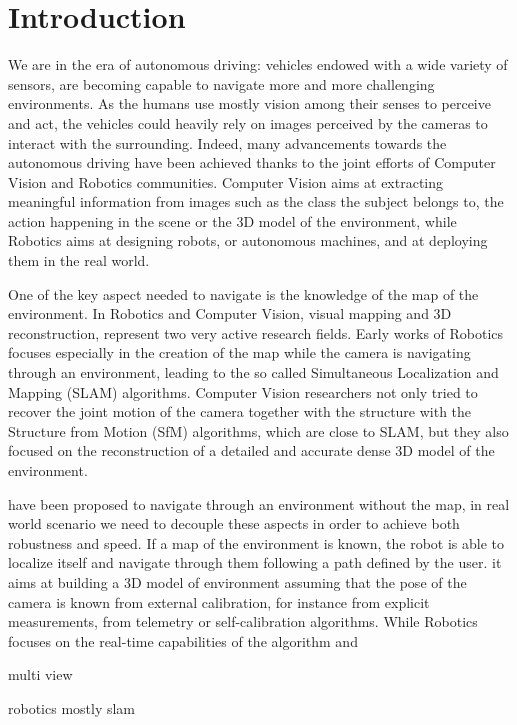 
\chapter{Introduction}
\label{sec:intro}
We are in the era of autonomous driving: vehicles endowed with a wide variety of sensors, are becoming  capable to navigate more and more challenging environments.
As the humans use mostly vision among their senses to perceive and act, the vehicles could heavily rely on images perceived by the cameras to interact with the surrounding.
Indeed, many advancements towards the autonomous driving have been achieved thanks to the joint efforts of Computer Vision and Robotics communities.
Computer Vision aims at extracting meaningful information from images such as the class the subject belongs to, the action happening in the scene or the 3D model of the environment, while Robotics aims at designing robots, or autonomous machines, and at deploying them in the real world.

One of the key aspect needed to navigate is the knowledge of the map of the environment. 
In Robotics and Computer Vision, visual mapping and 3D reconstruction, represent two very active research fields.
Early works of Robotics focuses especially in the creation of the map while the camera is navigating through an environment, leading to the so called Simultaneous Localization and Mapping (SLAM) algorithms.  Computer Vision researchers not only tried to recover the joint motion of the camera together with the structure with the Structure from Motion (SfM) algorithms, which are close to SLAM, but they also focused on the reconstruction of a detailed and accurate dense 3D model of the environment.





have been proposed to navigate through an environment without the map, in real world scenario we need to decouple these aspects in order to achieve both robustness and speed.
If a map of the environment is known, the robot is able to localize itself and navigate through them following a path defined by the user.
 it aims at building a 3D model of environment assuming that the pose of the camera is known from external calibration, for instance from explicit measurements, from telemetry or self-calibration algorithms.
While Robotics focuses on the real-time capabilities of the algorithm and 

multi view

robotics mostly slam


